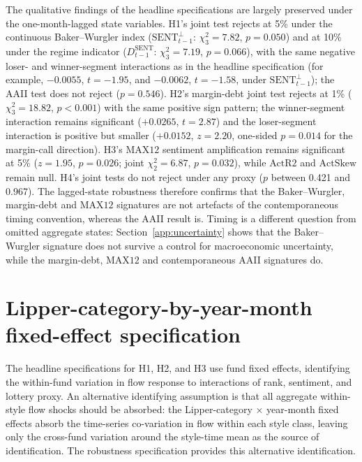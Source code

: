 \documentclass[12pt, oneside]{report}
\begin{document}




\noindent The qualitative findings of the headline specifications are
largely preserved under the one-month-lagged state variables. H1's joint
test rejects at 5\% under the continuous Baker--Wurgler index
($\text{SENT}^{\perp}_{t-1}$: $\chi^2_3 = 7.82$, $p = 0.050$) and at 10\%
under the regime indicator ($D^{\text{SENT}}_{t-1}$: $\chi^2_3 = 7.19$,
$p = 0.066$), with the same negative loser- and winner-segment
interactions as in the headline specification (for example,
$-0.0055$, $t = -1.95$, and $-0.0062$, $t = -1.58$, under
$\text{SENT}^{\perp}_{t-1}$); the AAII test does not reject
($p = 0.546$). H2's margin-debt joint test rejects at 1\%
($\chi^2_3 = 18.82$, $p < 0.001$) with the same positive sign pattern; the
winner-segment interaction remains significant ($+0.0265$, $t = 2.87$)
and the loser-segment interaction is positive but smaller
($+0.0152$, $z = 2.20$, one-sided $p = 0.014$ for the margin-call
direction). H3's $\text{MAX12}$ sentiment amplification remains
significant at 5\% ($z = 1.95$, $p = 0.026$; joint $\chi^2_2 = 6.87$,
$p = 0.032$), while $\text{ActR2}$ and $\text{ActSkew}$ remain null. H4's
joint tests do not reject under any proxy ($p$ between 0.421 and 0.967).
The lagged-state robustness therefore confirms that the Baker--Wurgler,
margin-debt and $\text{MAX12}$ signatures are not artefacts of the
contemporaneous timing convention, whereas the AAII result is. Timing is
a different question from omitted aggregate states:
Section~\ref{app:uncertainty} shows that the Baker--Wurgler signature
does not survive a control for macroeconomic uncertainty, while the
margin-debt, $\text{MAX12}$ and contemporaneous AAII signatures do.

\section{Lipper-category-by-year-month fixed-effect specification}
\label{sec:lipper_yearmo_fe}

\noindent The headline specifications for H1, H2, and H3 use fund
fixed effects, identifying the within-fund variation in flow
response to interactions of rank, sentiment, and lottery proxy. An
alternative identifying assumption is that all aggregate
within-style flow shocks should be absorbed: the Lipper-category
$\times$ year-month fixed effects absorb the time-series
co-variation in flow within each style class, leaving only the
cross-fund variation around the style-time mean as the source of
identification. The robustness specification provides this
alternative identification.
\end{document}

